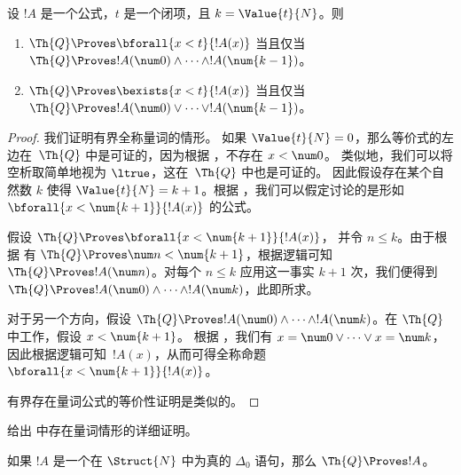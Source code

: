 \documentclass[../../../include/open-logic-section]{subfiles}
\begin{document}
\begin{lem}
设 $!A$ 是一个公式，$t$ 是一个闭项，且 $k=\Value{t}{N}$。则
\begin{enumerate}
\item $\Th{Q} \Proves \bforall{x<t}{!A(x)}$ 当且仅当 $\Th{Q} \Proves
    !A(\num 0) \land \dots \land !A(\num{k-1})$。
\item $\Th{Q} \Proves \bexists{x<t}{!A(x)}$ 当且仅当 $\Th{Q} \Proves
    !A(\num 0) \lor \dots \lor !A(\num{k-1})$。
\end{enumerate}
\end{lem}

\begin{proof}
    我们证明有界全称量词的情形。
    如果 $\Value{t}{N} = 0$，那么等价式的左边在~$\Th{Q}$ 中是可证的，因为根据 ，不存在 $x<\num 0$。
    类似地，我们可以将空析取简单地视为 $\ltrue$，这在~$\Th{Q}$ 中也是可证的。
    因此假设存在某个自然数 $k$ 使得 $\Value{t}{N} = k+1$。根据 ，我们可以假定讨论的是形如 $\bforall{x<\num{k+1}}{!A(x)}$ 的公式。

    假设 $\Th{Q} \Proves \bforall{x<\num{k+1}}{!A(x)}$，
    并令 $n \leq k$。由于根据  有 $\Th{Q} \Proves \num n < \num{k+1}$，根据逻辑可知 $\Th{Q} \Proves !A(\num n)$。对每个 $n \leq k$ 应用这一事实 $k+1$ 次，我们便得到 $\Th{Q} \Proves !A(\num 0)
    \land \dots \land !A(\num k)$，此即所求。

    对于另一个方向，假设 $\Th{Q} \Proves
    !A(\num 0) \land \dots \land !A(\num k)$。在 $\Th{Q}$ 中工作，假设 $x < \num{k+1}$。
    根据 ，我们有 $x = \num 0 \lor \dots \lor x = \num k$，因此根据逻辑可知~$!A(x)$，从而可得全称命题 $\bforall{x<\num{k+1}}{!A(x)}$。

    有界存在量词公式的等价性证明是类似的。
\end{proof}

\begin{prob}
给出  中存在量词情形的详细证明。
\end{prob}

\begin{lem}
如果 $!A$ 是一个在 $\Struct{N}$ 中为真的 $\Delta_0$ 语句，那么 $\Th{Q} \Proves !A$。
\end{lem}
\end{document}
